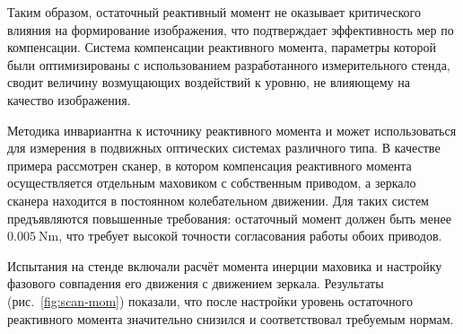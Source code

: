 Таким образом, остаточный реактивный момент не оказывает критического
влияния на формирование изображения, что подтверждает эффективность
мер по компенсации. Система компенсации реактивного момента,
параметры которой были оптимизированы с использованием разработанного
измерительного стенда, сводит величину возмущающих воздействий к
уровню, не влияющему на качество изображения.

Методика инвариантна к источнику реактивного момента и может использоваться для измерения в подвижных оптических системах различного типа. В качестве примера рассмотрен сканер, в котором компенсация реактивного момента осуществляется отдельным маховиком с собственным приводом, а зеркало сканера находится в постоянном колебательном движении. Для таких систем предъявляются повышенные требования: остаточный момент должен быть менее $\SI{0,005}{\newton\meter}$, что требует высокой точности согласования работы обоих приводов.

Испытания на стенде включали расчёт момента инерции маховика и настройку фазового совпадения его движения с движением зеркала. Результаты (рис.~\ref{fig:scan-mom}) показали, что после настройки уровень остаточного реактивного момента значительно снизился и соответствовал требуемым нормам.

